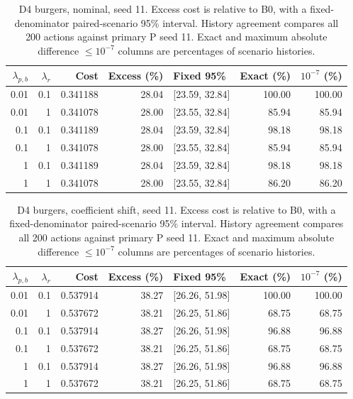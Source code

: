 \begin{table}[ht]
\centering\small
\caption{D4 burgers, nominal, seed 11. Excess cost is relative to B0, with a fixed-denominator paired-scenario 95\% interval. History agreement compares all 200 actions against primary P seed 11. Exact and maximum absolute difference $\leq10^{-7}$ columns are percentages of scenario histories.}\label{tab:weights_control_burgers_locked_nominal}
\begin{tabular}{@{}rrrrlrr@{}}\toprule
$\lambda_{p,b}$ & $\lambda_r$ & Cost & Excess (\%) & Fixed 95\% & Exact (\%) & $10^{-7}$ (\%)\\\midrule
0.01 & 0.1 & 0.341188 & 28.04 & [23.59, 32.84] & 100.00 & 100.00\\
0.01 & 1 & 0.341078 & 28.00 & [23.55, 32.84] & 85.94 & 85.94\\
0.1 & 0.1 & 0.341189 & 28.04 & [23.59, 32.84] & 98.18 & 98.18\\
0.1 & 1 & 0.341078 & 28.00 & [23.55, 32.84] & 85.94 & 85.94\\
1 & 0.1 & 0.341189 & 28.04 & [23.59, 32.84] & 98.18 & 98.18\\
1 & 1 & 0.341078 & 28.00 & [23.55, 32.84] & 86.20 & 86.20\\
\bottomrule\end{tabular}
\end{table}

\begin{table}[ht]
\centering\small
\caption{D4 burgers, coefficient shift, seed 11. Excess cost is relative to B0, with a fixed-denominator paired-scenario 95\% interval. History agreement compares all 200 actions against primary P seed 11. Exact and maximum absolute difference $\leq10^{-7}$ columns are percentages of scenario histories.}\label{tab:weights_control_burgers_locked_coefficient_ood}
\begin{tabular}{@{}rrrrlrr@{}}\toprule
$\lambda_{p,b}$ & $\lambda_r$ & Cost & Excess (\%) & Fixed 95\% & Exact (\%) & $10^{-7}$ (\%)\\\midrule
0.01 & 0.1 & 0.537914 & 38.27 & [26.26, 51.98] & 100.00 & 100.00\\
0.01 & 1 & 0.537672 & 38.21 & [26.25, 51.86] & 68.75 & 68.75\\
0.1 & 0.1 & 0.537914 & 38.27 & [26.26, 51.98] & 96.88 & 96.88\\
0.1 & 1 & 0.537672 & 38.21 & [26.25, 51.86] & 68.75 & 68.75\\
1 & 0.1 & 0.537914 & 38.27 & [26.26, 51.98] & 96.88 & 96.88\\
1 & 1 & 0.537672 & 38.21 & [26.25, 51.86] & 68.75 & 68.75\\
\bottomrule\end{tabular}
\end{table}

